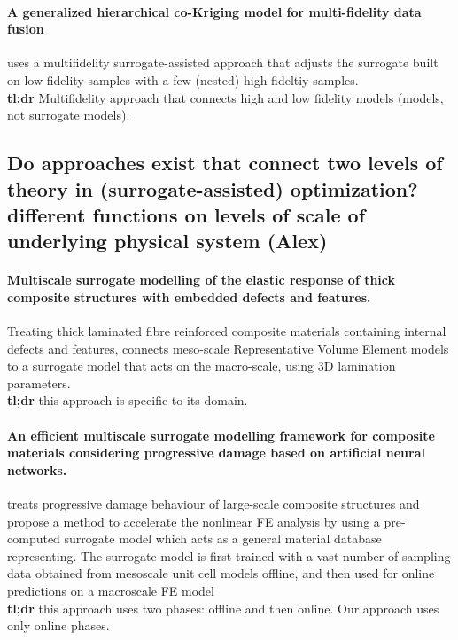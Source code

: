 \documentclass[preprint,12pt]{elsarticle}
\begin{document}
\paragraph{A generalized hierarchical co-Kriging model for multi-fidelity
data fusion}
\cite{zhou2020generalized} uses a multifidelity surrogate-assisted approach that adjusts the surrogate built on low fidelity samples with a few (nested) high fideltiy samples. 
\\ \textbf{tl;dr} Multifidelity approach that connects high and low fidelity models (models, not surrogate models).


\subsection{Do approaches exist that connect two levels of theory in (surrogate-assisted) optimization? different functions on levels of scale of underlying physical system (Alex)}

\paragraph{Multiscale surrogate modelling of the elastic response of thick composite structures with embedded defects and features.} Treating thick laminated fibre reinforced composite materials containing internal defects and features, \cite{el2018multiscale} connects meso-scale Representative Volume Element models to a surrogate model that acts on the macro-scale, using 3D lamination parameters. \\ \textbf{tl;dr} this approach is specific to its domain.

\paragraph{An efficient multiscale surrogate modelling framework for composite materials considering progressive damage based on artificial neural networks.} 
\cite{yan2020efficient} treats progressive damage behaviour of large-scale composite structures and propose a method to accelerate the nonlinear FE analysis by using a pre-computed surrogate model which acts as a general material database representing. The surrogate model is first trained with a vast number of sampling data obtained from mesoscale unit cell models offline, and then used for online predictions on a macroscale FE model
\\ \textbf{tl;dr} this approach uses two phases: offline and then online. Our approach uses only online phases.
\end{document}

